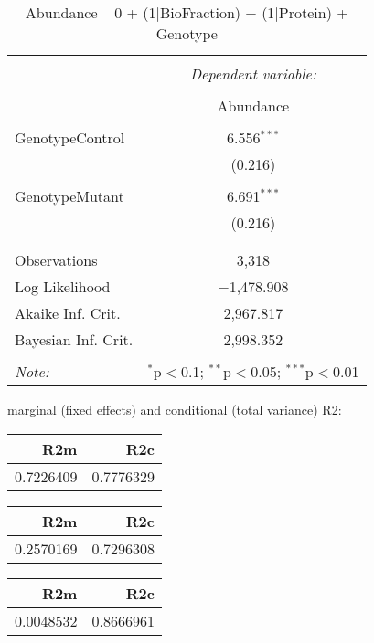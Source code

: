 \documentclass[11pt]{report}
\begin{document}
\begin{table}[!htbp] \centering 
  \caption{Abundance ~ 0 + (1|BioFraction) + (1|Protein) + Genotype} 
  \label{} 
\begin{tabular}{@{\extracolsep{5pt}}lc} 
\\[-1.8ex]\hline 
\hline \\[-1.8ex] 
 & \multicolumn{1}{c}{\textit{Dependent variable:}} \\ 
\cline{2-2} 
\\[-1.8ex] & Abundance \\ 
\hline \\[-1.8ex] 
 GenotypeControl & 6.556$^{***}$ \\ 
  & (0.216) \\ 
  & \\ 
 GenotypeMutant & 6.691$^{***}$ \\ 
  & (0.216) \\ 
  & \\ 
\hline \\[-1.8ex] 
Observations & 3,318 \\ 
Log Likelihood & $-$1,478.908 \\ 
Akaike Inf. Crit. & 2,967.817 \\ 
Bayesian Inf. Crit. & 2,998.352 \\ 
\hline 
\hline \\[-1.8ex] 
\textit{Note:}  & \multicolumn{1}{r}{$^{*}$p$<$0.1; $^{**}$p$<$0.05; $^{***}$p$<$0.01} \\ 
\end{tabular} 
\end{table} 
marginal (fixed effects) and conditional (total variance) R2:

\begin{tabular}{r|r}
\hline
R2m & R2c\\
\hline
0.7226409 & 0.7776329\\
\hline
\end{tabular}

\begin{tabular}{r|r}
\hline
R2m & R2c\\
\hline
0.2570169 & 0.7296308\\
\hline
\end{tabular}

\begin{tabular}{r|r}
\hline
R2m & R2c\\
\hline
0.0048532 & 0.8666961\\
\hline
\end{tabular}
\end{document}

